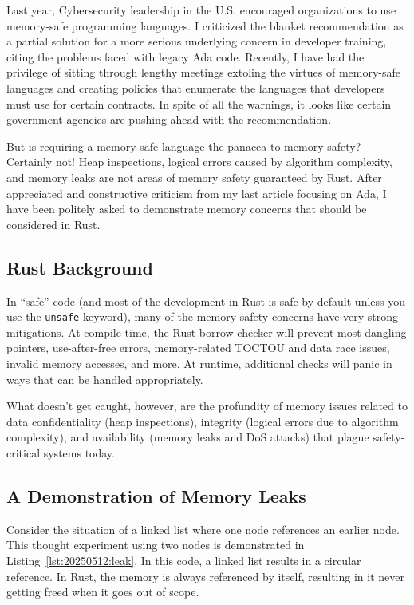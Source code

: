Last year, Cybersecurity leadership in the U.S. encouraged organizations to use memory-safe programming languages. I criticized the blanket recommendation\autocite{20250512:hood2} as a partial solution for a more serious underlying concern in developer training, citing the problems faced with legacy Ada code\autocite{20250512:hood}. Recently, I have had the privilege of sitting through lengthy meetings extoling the virtues of memory-safe languages and creating policies that enumerate the languages that developers must use for certain contracts. In spite of all the warnings, it looks like certain government agencies are pushing ahead with the recommendation.

But is requiring a memory-safe language the panacea to memory safety? Certainly not! Heap inspections, logical errors caused by algorithm complexity, and memory leaks are not areas of memory safety guaranteed by Rust. After appreciated and constructive criticism from my last article focusing on Ada, I have been politely asked to demonstrate memory concerns that should be considered in Rust.

\subsection*{Rust Background}
In ``safe'' code (and most of the development in Rust is safe by default unless you use the \texttt{unsafe} keyword), many of the memory safety concerns have very strong mitigations. At compile time, the Rust borrow checker will prevent most dangling pointers, use-after-free errors, memory-related TOCTOU and data race issues, invalid memory accesses, and more. At runtime, additional checks will panic in ways that can be handled appropriately.

What doesn't get caught, however, are the profundity of memory issues related to data confidentiality (heap inspections), integrity (logical errors due to algorithm complexity), and availability (memory leaks and DoS attacks) that plague safety-critical systems today.

\subsection*{A Demonstration of Memory Leaks}

Consider the situation of a linked list where one node references an earlier node. This thought experiment using two nodes is demonstrated in Listing~\ref{lst:20250512:leak}. In this code, a linked list results in a circular reference. In Rust, the memory is always referenced by itself, resulting in it never getting freed when it goes out of scope.

